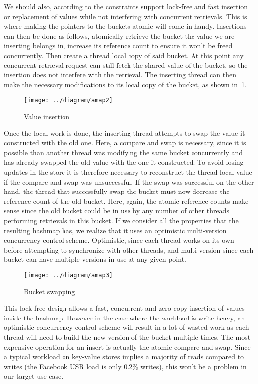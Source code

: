 \documentclass[11pt]{article}
\begin{document}
We should also, according to the constraints support lock-free and
fast insertion or replacement of values while not interfering with
concurrent retrievals. This is where making the pointers to the
buckets atomic will come in handy. Insertions can then be done as
follows, atomically retrieve the bucket the value we are inserting
belongs in, increase its reference count to ensure it won't be freed
concurrently. Then create a thread local copy of said bucket. At this
point any concurrent retrieval request can still fetch the shared
value of the bucket, so the insertion does not interfere with the
retrieval. The inserting thread can then make the necessary
modifications to its local copy of the bucket, as shown
in~\ref{fig:omvcc-insert}.

\begin{figure}[htb!]
  \texttt{[image: ../diagram/amap2]}
  \caption{Value insertion}
  \label{fig:omvcc-insert}
\end{figure}

Once the local work is done, the inserting thread attempts to swap the
value it constructed with the old one. Here, a compare and swap is
necessary, since it is possible than another thread was modifying the
same bucket concurrently and has already swapped the old value with
the one it constructed. To avoid losing updates in the store it is
therefore necessary to reconstruct the thread local value if the
compare and swap was unsuccessful. If the swap was successful on the
other hand, the thread that successfully swap the bucket must now
decrease the reference count of the old bucket. Here, again, the
atomic reference counts make sense since the old bucket could be in
use by any number of other threads performing retrievals in this
bucket. If we consider all the properties that the resulting hashmap
has, we realize that it uses an optimistic multi-version concurrency
control scheme. Optimistic, since each thread works on its own before
attempting to synchronize with other threads, and multi-version since
each bucket can have multiple versions in use at any given point.

\begin{figure}
  \texttt{[image: ../diagram/amap3]}
  \caption{Bucket swapping}
  \label{fig:omvcc-swap}
\end{figure}

This lock-free design allows a fast, concurrent and zero-copy
insertion of values inside the hashmap. However in the case where the
workload is write-heavy, an optimistic concurrency control scheme will
result in a lot of wasted work as each thread will need to build
the new version of the bucket multiple times. The most expensive
operation for an insert is actually the atomic compare and swap. Since
a typical workload on key-value stores implies a majority of reads
compared to writes (the Facebook USR load is only 0.2\% writes), this
won't be a problem in our target use case.
\end{document}
